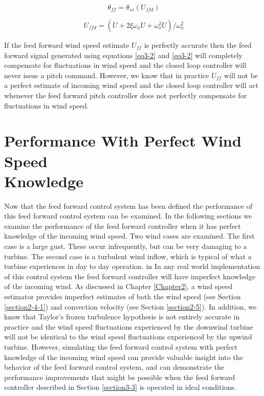 \begin{equation}
	\theta_{ff} =  \theta_{ss}(U_{ffd}) \label{eq3-2}
\end{equation}

\begin{equation}
	U_{ffd} =  (\ddot{U} + 2 \xi \omega_o \dot{U} + \omega_o^2 U) / \omega_o^2 \label{eq3-3}
\end{equation}

If the feed forward wind speed estimate $U_{ff}$ is perfectly accurate then the feed forward signal generated using equations \ref{eq3-2} and \ref{eq3-2} will completely compensate for fluctuations in wind speed and the closed loop controller will never issue a pitch command. However, we know that in practice $U_{ff}$ will not be a perfect estimate of incoming wind speed and the closed loop controller will act whenever the feed forward pitch controller does not perfectly compensate for fluctuations in wind speed.

\section{Performance With Perfect Wind Speed \\
		Knowledge} \label{section3-4}

Now that the feed forward control system has been defined the performance of this feed forward control system can be examined. In the following sections we examine the performance of the feed forward controller when it has perfect knowledge of the incoming wind speed. Two wind cases are examined. The first case is a large gust. These occur infrequently, but can be very damaging to a turbine. The second case is a turbulent wind inflow, which is typical of what a turbine experiences in day to day operation. in In any real world implementation of this control system the feed forward controller will have imperfect knowledge of the incoming wind. As discussed in Chapter \ref{Chapter2}, a wind speed estimator provides imperfect estimates of both the wind speed (see Section  \ref{section2-4-1}) and convection velocity (see Section \ref{section2-5}). In addition, we know that Taylor's frozen turbulence hypothesis is not entirely accurate in practice and the wind speed fluctuations experienced by the downwind turbine will not be identical to the wind speed fluctuations experienced by the upwind turbine. However, simulating the feed forward control system with perfect knowledge of the incoming wind speed can provide valuable insight into the behavior of the feed forward control system, and can demonstrate the performance improvements that might be possible when the feed forward controller described in Section \ref{section3-3} is operated in ideal conditions. 



